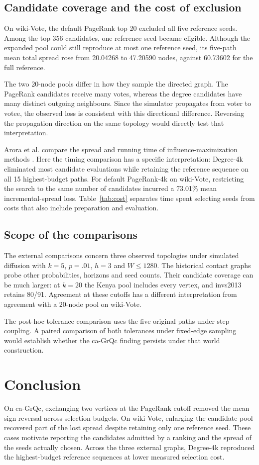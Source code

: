 \documentclass[smallextended]{svjour3}
\begin{document}
\subsection{Candidate coverage and the cost of exclusion}
On wiki-Vote, the default PageRank top 20 excluded all five reference seeds. Among the top 356 candidates, one reference seed became eligible. Although the expanded pool could still reproduce at most one reference seed, its five-path mean total spread rose from 20.04268 to 47.20590 nodes, against 60.73602 for the full reference.

The two 20-node pools differ in how they sample the directed graph. The PageRank candidates receive many votes, whereas the degree candidates have many distinct outgoing neighbours. Since the simulator propagates from voter to votee, the observed loss is consistent with this directional difference. Reversing the propagation direction on the same topology would directly test that interpretation.

Arora et al. compare the spread and running time of influence-maximization methods \cite{ref16}. Here the timing comparison has a specific interpretation: Degree-4k eliminated most candidate evaluations while retaining the reference sequence on all 15 highest-budget paths. For default PageRank-4k on wiki-Vote, restricting the search to the same number of candidates incurred a 73.01\% mean incremental-spread loss. Table~\ref{tab:cost} separates time spent selecting seeds from costs that also include preparation and evaluation.

\subsection{Scope of the comparisons}
The external comparisons concern three observed topologies under simulated diffusion with $k=5$, $p=.01$, $h=3$ and $W\le1280$. The historical contact graphs probe other probabilities, horizons and seed counts. Their candidate coverage can be much larger: at $k=20$ the Kenya pool includes every vertex, and invs2013 retains 80/91. Agreement at these cutoffs has a different interpretation from agreement with a 20-node pool on wiki-Vote.

The post-hoc tolerance comparison uses the five original paths under step coupling. A paired comparison of both tolerances under fixed-edge sampling would establish whether the ca-GrQc finding persists under that world construction.

\section{Conclusion}
On ca-GrQc, exchanging two vertices at the PageRank cutoff removed the mean sign reversal across selection budgets. On wiki-Vote, enlarging the candidate pool recovered part of the lost spread despite retaining only one reference seed. These cases motivate reporting the candidates admitted by a ranking and the spread of the seeds actually chosen. Across the three external graphs, Degree-4k reproduced the highest-budget reference sequences at lower measured selection cost.
\end{document}
